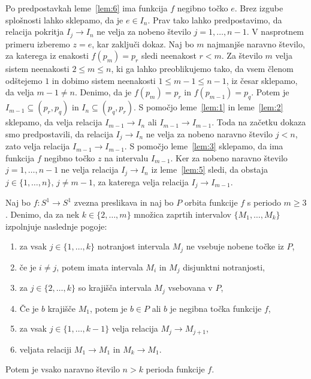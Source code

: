 \documentclass[../TG_magistrsko_delo_sections.tex]{subfiles}
\begin{document}
\begin{dokaz}
Po predpostavkah leme~\ref{lem:6} ima funkcija $f$ negibno točko $e$. Brez izgube splošnosti lahko sklepamo, da je $e \in I_n$. Prav tako lahko predpostavimo, da relacija pokritja $I_j \to I_n$ ne velja za nobeno število $j = 1, \dots, n-1$. V nasprotnem primeru izberemo $z=e$, kar zaključi dokaz.
Naj bo $m$ najmanjše naravno število, za katerega iz enakosti $f(p_m) = p_r$ sledi neenakost $r < m$. Za število $m$ velja sistem neenakosti $2 \leq m \leq n$, ki ga lahko preoblikujemo tako, da vsem členom odštejemo $1$ in dobimo sistem neenakosti $1 \leq m -1 \leq n-1$, iz česar sklepamo, da velja $m-1 \neq n$. Denimo, da je $f(p_m) = p_r$ in $f(p_{m-1}) = p_q$. Potem je $I_{m-1} \subseteq (p_r, p_q)$ in $I_n \subseteq (p_q, p_r)$. S pomočjo leme~\ref{lem:1} in leme~\ref{lem:2} sklepamo, da velja relacija $I_{m-1} \to I_n$ ali $I_{m-1} \to I_{m-1}$. Toda na začetku dokaza smo predpostavili, da relacija $I_{j} \to I_n$ ne velja za nobeno naravno število $j < n$, zato velja relacija $I_{m-1} \to I_{m-1}$. S pomočjo leme~\ref{lem:3} sklepamo, da ima funkcija $f$ negibno točko $z$ na intervalu $I_{m-1}$. Ker za nobeno naravno število $j = 1, \dots, n-1$ ne velja relacija $I_j \to I_n$ iz leme~\ref{lem:5} sledi, da obstaja $j \in \{1, \dots, n\}$, $j \neq m-1$, za katerega velja relacija $I_j \to I_{m-1}$.

\end{dokaz}

\begin{lema}\label{lem:7}		%
Naj bo $f : S^1 \to S^1$ zvezna preslikava in naj bo $P$ orbita funkcije $f$ s periodo $m \geq 3$. Denimo, da za nek $k \in \{2, \dots, m\}$ množica zaprtih intervalov $\{M_1, \dots, M_k\}$ izpolnjuje naslednje pogoje:
\begin{enumerate}
\item za vsak $j \in \{1, \dots, k\}$ notranjost intervala $M_j$ ne vsebuje nobene točke iz $P$,\label{enum:p1}
\item če je $i \neq j$, potem imata intervala $M_i$ in $M_j$ disjunktni notranjosti,\label{enum:p2}
\item za $j \in \{2, \dots, k\}$ so krajišča intervala $M_j$ vsebovana v $P$,\label{enum:p3}
\item Če je $b$ krajišče $M_1$, potem je $b \in P$ ali $b$ je negibna točka funkcije $f$,\label{enum:p4}
\item za vsak $j \in \{1, \dots, k-1 \}$ velja relacija $M_j \to M_{j+1}$,\label{enum:p5}
\item veljata relaciji $M_1 \to M_1$ in $M_k \to M_1$.\label{enum:p6}
\end{enumerate}
Potem je vsako naravno število $n > k$ perioda funkcije $f$.
\end{lema}
\end{document}
